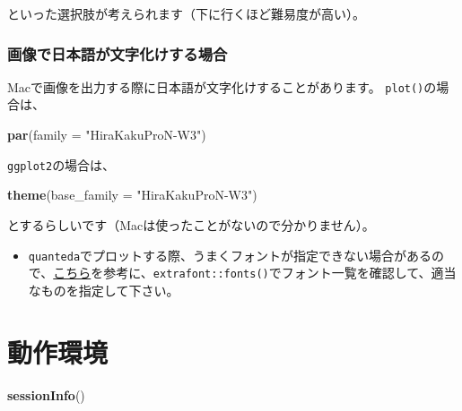 \documentclass[]{bxjsreport}
\newenvironment{Shaded}{\begin{snugshade}}{\end{snugshade}}
\newcommand{\DataTypeTok}[1]{\textcolor[rgb]{0.13,0.29,0.53}{#1}}
\newcommand{\KeywordTok}[1]{\textcolor[rgb]{0.13,0.29,0.53}{\textbf{#1}}}
\newcommand{\NormalTok}[1]{#1}
\newcommand{\StringTok}[1]{\textcolor[rgb]{0.31,0.60,0.02}{#1}}
\providecommand{\tightlist}{%
  \setlength{\itemsep}{0pt}\setlength{\parskip}{0pt}}
\let\asdf\section
\renewcommand{\section}{\chapter}
\let\asdff\subsection
\renewcommand{\subsection}{\asdf}
\renewcommand{\subsubsection}{\asdff}
\begin{document}
といった選択肢が考えられます（下に行くほど難易度が高い）。

\hypertarget{ux753bux50cfux3067ux65e5ux672cux8a9eux304cux6587ux5b57ux5316ux3051ux3059ux308bux5834ux5408}{%
\subsubsection{画像で日本語が文字化けする場合}\label{ux753bux50cfux3067ux65e5ux672cux8a9eux304cux6587ux5b57ux5316ux3051ux3059ux308bux5834ux5408}}

Macで画像を出力する際に日本語が文字化けすることがあります。
\texttt{plot()}の場合は、

\begin{Shaded}
\begin{Highlighting}[]
\KeywordTok{par}\NormalTok{(}\DataTypeTok{family =} \StringTok{"HiraKakuProN-W3"}\NormalTok{)}
\end{Highlighting}
\end{Shaded}

\texttt{ggplot2}の場合は、

\begin{Shaded}
\begin{Highlighting}[]
\KeywordTok{theme}\NormalTok{(}\DataTypeTok{base_family =} \StringTok{"HiraKakuProN-W3"}\NormalTok{)}
\end{Highlighting}
\end{Shaded}

とするらしいです（Macは使ったことがないので分かりません）。

\begin{itemize}
\tightlist
\item
  \texttt{quanteda}でプロットする際、うまくフォントが指定できない場合があるので、\href{https://github.com/quanteda/quanteda/issues/1317}{こちら}を参考に、\texttt{extrafont::fonts()}でフォント一覧を確認して、適当なものを指定して下さい。
\end{itemize}

\hypertarget{environment}{%
\section*{動作環境}\label{environment}}

\begin{Shaded}
\begin{Highlighting}[]
\KeywordTok{sessionInfo}\NormalTok{()}
\end{Highlighting}
\end{Shaded}
\end{document}
